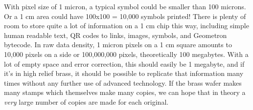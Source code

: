 With pixel size of 1 micron, a typical symbol could be smaller than 100 microns.  Or a 1 cm area could have 100x100 = 10,000 symbols printed! There is plenty of room to store quite a lot of information on a 1 cm chip this way, including simple human readable text, QR codes to links, images, symbols, and Geometron bytecode.  In raw data density, 1 micron pixels on a 1 cm square amounts to 10,000 pixels on a side or 100,000,000 pixels, theoretically 100 megabytes.  With a lot of empty space and error correction, this should easily be 1 megabyte, and if it's in high relief brass, it should be possible to replicate that information many times without any further use of advanced technology.  If the brass wafer makes many stamps which themselves make many copies, we can hope that in theory a \emph{very} large number of copies are made for each original.  